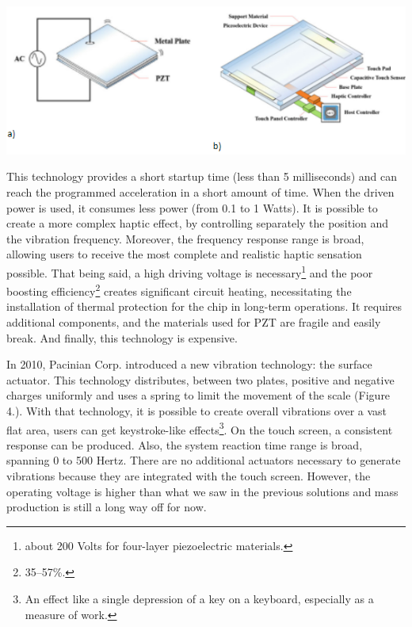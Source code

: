 \documentclass[12pt, a4paper]{article}
\begin{document}
\begin{multicols}{2}
\captionsetup{type=figure}
\includegraphics[width=.49\textwidth]{piezo.png}
\vspace*{3mm}

\par This technology provides a short startup time (less than 5 milliseconds) and can reach the programmed acceleration in a short amount of time. When the driven power is used, it consumes less power (from 0.1 to 1 Watts). It is possible to create a more complex haptic effect, by controlling separately the position and the vibration frequency. Moreover, the frequency response range is broad, allowing users to receive the most complete and realistic haptic sensation possible. That being said, a high driving voltage is necessary\footnote{about 200 Volts for four-layer piezoelectric materials.} and the poor boosting efficiency\footnote{35–57\%.} creates significant circuit heating, necessitating the installation of thermal protection for the chip in long-term operations. It requires additional components, and the materials used for PZT are fragile and easily break. And finally, this technology is expensive\cite{TBHMI}.
\par In 2010, Pacinian Corp. introduced a new vibration technology: the surface actuator. This technology distributes, between two plates, positive and negative charges uniformly and uses a spring to limit the movement of the scale (Figure 4.). With that technology, it is possible to create overall vibrations over a vast flat area, users can get keystroke-like effects\footnote{An effect like a single depression of a key on a keyboard, especially as a measure of work.}. On the touch screen, a consistent response can be produced. Also, the system reaction time range is broad, spanning 0 to 500 Hertz. There are no additional actuators necessary to generate vibrations because they are integrated with the touch screen. However, the operating voltage is higher than what we saw in the previous solutions and mass production is still a long way off for now. \cite{TBHMI}


\end{multicols}
\end{document}
